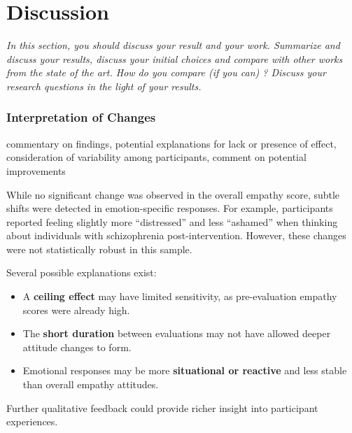 \chapter{Discussion}
\label{ch:discussion}

\emph{In this section, you should discuss your result and your work. Summarize and discuss your results,  discuss your initial choices and compare with other works from the state of the art. How do you compare (if you can) ? Discuss your research questions in the light of your results. }



\subsection{Interpretation of Changes}

commentary on findings, potential explanations for lack or presence of effect, consideration of variability among participants, comment on potential improvements


While no significant change was observed in the overall empathy score, subtle shifts were detected in emotion-specific responses. For example, participants reported feeling slightly more “distressed” and less “ashamed” when thinking about individuals with schizophrenia post-intervention. However, these changes were not statistically robust in this sample.

Several possible explanations exist:
\begin{itemize}
  \item A \textbf{ceiling effect} may have limited sensitivity, as pre-evaluation empathy scores were already high.
  \item The \textbf{short duration} between evaluations may not have allowed deeper attitude changes to form.
  \item Emotional responses may be more \textbf{situational or reactive} and less stable than overall empathy attitudes.
\end{itemize}

Further qualitative feedback could provide richer insight into participant experiences.